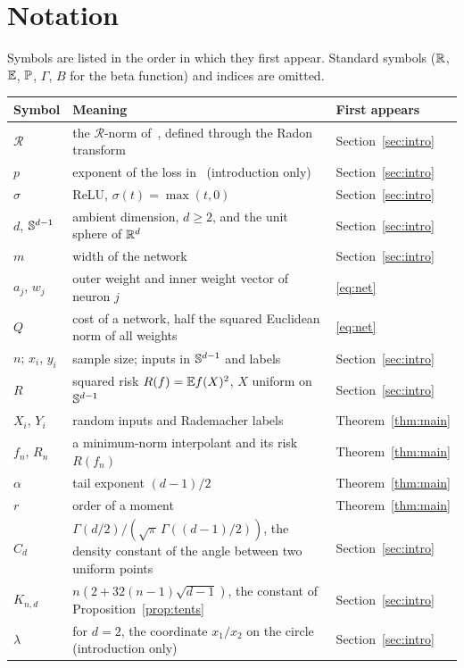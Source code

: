 \section{Notation}\label{app:notation}
Symbols are listed in the order in which they first appear. Standard symbols ($\mathbb{R}$, $\mathbb{E}$, $\mathbb{P}$, $\Gamma$, $B$ for the beta function) and indices are omitted.

\begin{longtable}{@{}lp{}p{}@{}}
\toprule
Symbol & Meaning & First appears \\ \midrule
$\mathcal{R}$ & the $\mathcal R$-norm of~\cite{OWSS}, defined through the Radon transform & Section~\ref{sec:intro}\\
$p$ & exponent of the loss in~\cite{JVS} (introduction only) & Section~\ref{sec:intro}\\
$\sigma$ & ReLU, $\sigma(t)=\max(t,0)$ & Section~\ref{sec:intro}\\
$d$, $\mathbb{S}^{d-1}$ & ambient dimension, $d\ge2$, and the unit sphere of $\mathbb{R}^d$ & Section~\ref{sec:intro}\\
$m$ & width of the network & Section~\ref{sec:intro}\\
$a_j$, $w_j$ & outer weight and inner weight vector of neuron $j$ & \eqref{eq:net}\\
$Q$ & cost of a network, half the squared Euclidean norm of all weights & \eqref{eq:net}\\
$n$; $x_i$, $y_i$ & sample size; inputs in $\mathbb{S}^{d-1}$ and labels & Section~\ref{sec:intro}\\
$R$ & squared risk $R(f)=\mathbb{E} f(X)^2$, $X$ uniform on $\mathbb{S}^{d-1}$ & Section~\ref{sec:intro}\\
$X_i$, $Y_i$ & random inputs and Rademacher labels & Theorem~\ref{thm:main}\\
$f_n$, $R_n$ & a minimum-norm interpolant and its risk $R(f_n)$ & Theorem~\ref{thm:main}\\
$\alpha$ & tail exponent $(d-1)/2$ & Theorem~\ref{thm:main}\\
$r$ & order of a moment & Theorem~\ref{thm:main}\\
$C_d$ & $\Gamma(d/2)/(\sqrt\pi\,\Gamma((d-1)/2))$, the density constant of the angle between two uniform points & Section~\ref{sec:intro}\\
$K_{n,d}$ & $n(2+32(n-1)\sqrt{d-1})$, the constant of Proposition~\ref{prop:tents} & Section~\ref{sec:intro}\\
$\lambda$ & for $d=2$, the coordinate $x_1/x_2$ on the circle (introduction only) & Section~\ref{sec:intro}\\

\end{longtable}
